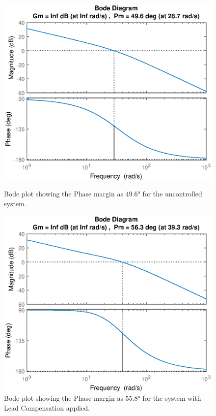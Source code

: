 \documentclass{article}
\begin{document}
\begin{figure}[H]
	\hspace{0.5cm}
	\begin{minipage}{7cm}
		\centering
		\includegraphics[scale=0.5]{fig11}
		\caption{Bode plot showing the Phase margin as 49.6$\si{\degree}$ for the uncontrolled system.}
	\end{minipage}
	\hspace{1cm}
	\begin{minipage}{7cm}
		\centering
		\includegraphics[scale=0.5]{fig12}
		\caption{Bode plot showing the Phase margin as 55.8$\si{\degree}$ for the system with Lead Compensation applied.}
	\end{minipage}
\end{figure}
\end{document}
